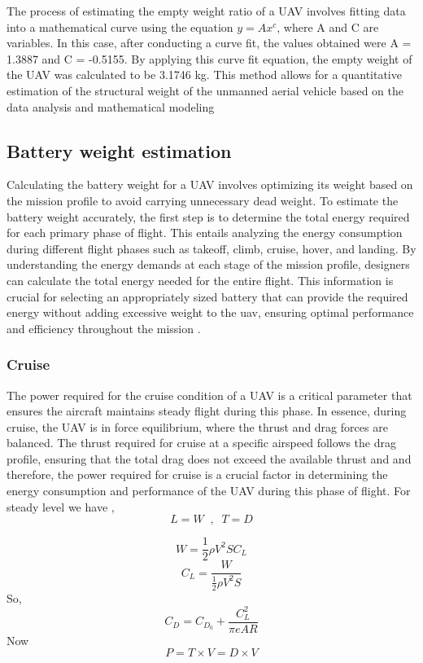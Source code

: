 \documentclass[12 pt]{article}
\begin{document}
The process of estimating the empty weight ratio of a UAV involves fitting data into a mathematical curve using the equation $y = A x^c$, where A and C are variables. In this case, after conducting a curve fit, the values obtained were A = 1.3887 and C = -0.5155. By applying this curve fit equation, the empty weight of the UAV was calculated to be 3.1746 kg. This method allows for a quantitative estimation of the structural weight of the unmanned aerial vehicle based on the data analysis and mathematical modeling

\newpage

\subsection{Battery weight estimation}

Calculating the battery weight for a UAV  involves optimizing its weight based on the mission profile to avoid carrying unnecessary dead weight. To estimate the battery weight accurately, the first step is to determine the total energy required for each primary phase of flight. This entails analyzing the energy consumption during different flight phases such as takeoff, climb, cruise, hover, and landing. By understanding the energy demands at each stage of the mission profile, designers can calculate the total energy needed for the entire flight. This information is crucial for selecting an appropriately sized battery that can provide the required energy without adding excessive weight to the uav, ensuring optimal performance and efficiency throughout the mission
.

\subsubsection{Cruise}
The power required for the cruise condition of a UAV is a critical parameter that ensures the aircraft maintains steady flight during this phase. In essence, during cruise, the UAV is in force equilibrium, where the thrust and drag forces are balanced. The thrust required for cruise at a specific airspeed follows the drag profile, ensuring that the total drag does not exceed the available thrust and and therefore, the power required for cruise is a crucial factor in determining the energy consumption and performance of the UAV during this phase of flight.
For steady level we have ,
$$ L = W \; \; , \; \; T = D$$

$$ W = \frac{1}{2} \rho V^2 S C_L $$
$$ C_L = \frac{W}{\frac{1}{2} \rho V^2 S}$$
So,
$$ C_D = C_{D_0} + \frac{C_L^2}{\pi e AR} $$
Now 
$$ P = T\times V = D\times V $$
\end{document}

